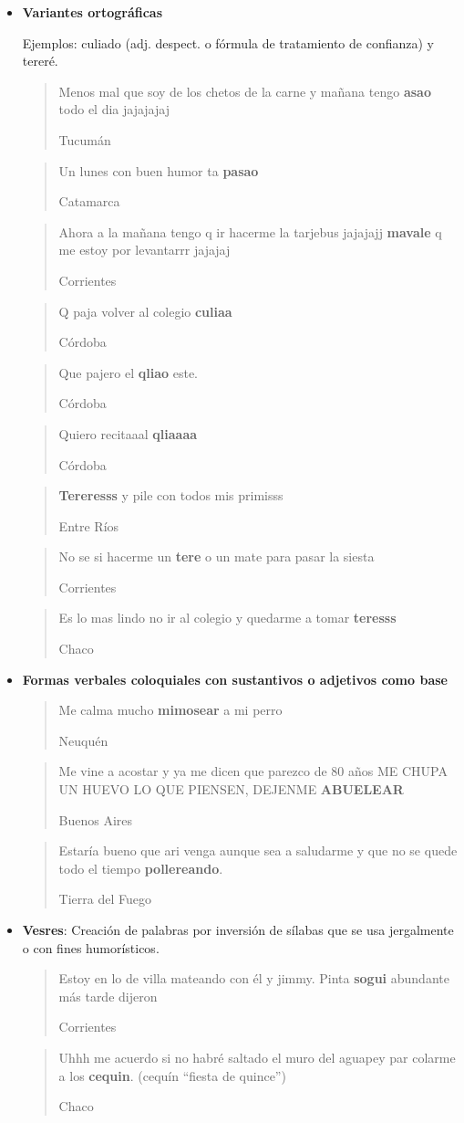 \begin{itemize}
  \blockquote[Córdoba]{Esta \textbf{locaza} esa mina para hacer eso}

\item \textbf{Variantes ortográficas}
  
  Ejemplos: culiado (adj. despect. o fórmula de tratamiento de confianza) y tereré.

  \blockquote[Tucumán]{Menos mal que soy de los chetos de la carne y mañana tengo \textbf{asao} todo el dia jajajajaj}

  \blockquote[Catamarca]{Un lunes con buen humor ta \textbf{pasao} }

  \blockquote[Corrientes]{Ahora a la mañana tengo q ir hacerme la tarjebus jajajajj \textbf{mavale} q me estoy por levantarrr jajajaj}  

  \blockquote[Córdoba]{Q paja volver al colegio \textbf{culiaa}}

  \blockquote[Córdoba]{Que pajero el \textbf{qliao} este.}

  \blockquote[Córdoba]{Quiero recitaaal \textbf{qliaaaa}}

  \blockquote[Entre Ríos]{\textbf{Tereresss} y pile con todos mis primisss}

  \blockquote[Corrientes]{No se si hacerme un \textbf{tere} o un mate para pasar la siesta}

  \blockquote[Chaco]{Es lo mas lindo no ir al colegio y quedarme a tomar \textbf{teresss}}


\item \textbf{Formas verbales coloquiales con sustantivos o adjetivos como base}

  \blockquote[Neuquén]{Me calma mucho \textbf{mimosear} a mi perro }

  \blockquote[Buenos Aires]{Me vine a acostar y ya me dicen que parezco de 80 años ME CHUPA UN HUEVO LO QUE PIENSEN, DEJENME \textbf{ABUELEAR} }

  \blockquote[Tierra del Fuego]{Estaría bueno que ari venga aunque sea a saludarme y que no se quede todo el tiempo \textbf{pollereando}.}


\item \textbf{Vesres}: Creación de palabras por inversión de sílabas que se usa jergalmente o con fines humorísticos.

  \blockquote[Corrientes]{Estoy en lo de villa mateando con él y jimmy. Pinta \textbf{sogui} abundante más tarde dijeron }

  \blockquote[Chaco]{Uhhh me acuerdo si no habré saltado el muro del aguapey par colarme a los \textbf{cequin}. (cequín “fiesta de quince”)}


\end{itemize}
